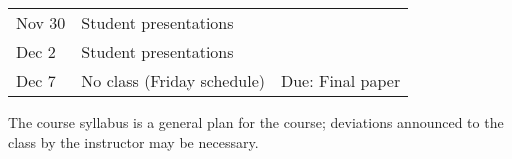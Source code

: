 \documentclass[12pt]{article}
\begin{document}
\begin{center}
\begin{tabular}[c]{lll}
\hline
Nov 30     & Student presentations                        &                                                      \\
Dec 2      & Student presentations                        &                                                      \\
\hline
Dec 7      & No class (Friday schedule)                   & Due: Final paper                                     \\
\hline \hline
\end{tabular}
\end{center}

The course syllabus is a general plan for the course; deviations announced to the class by the instructor may be necessary.
\end{document}
